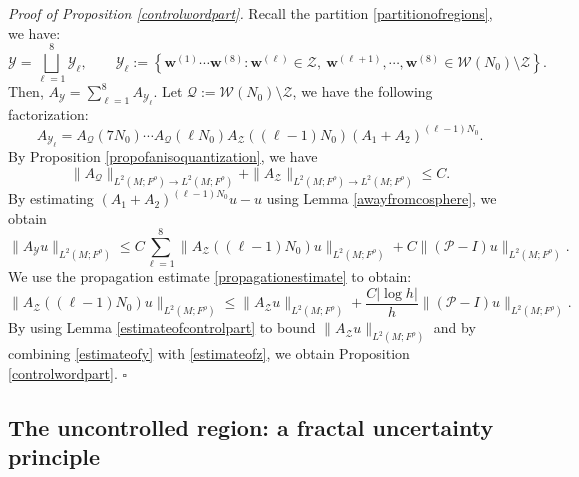 \documentclass[11pt,oneside,reqno]{amsart}
\theoremstyle{definition}
\numberwithin{equation}{section}
\theoremstyle{plain}
\begin{document}
\noindent \textit{Proof of Proposition \ref{controlwordpart}.} Recall the partition \eqref{partitionofregions}, we have:
\begin{equation*}
    \mathcal{Y}=\bigsqcup_{\ell=1}^8 \mathcal{Y}_{\ell}, \qquad \mathcal{Y}_{\ell}:=\left\{\mathbf{w}^{(1)} \cdots \mathbf{w}^{(8)} : \mathbf{w}^{(\ell)} \in \mathcal{Z}, \  \mathbf{w}^{(\ell+1)}, \cdots, \mathbf{w}^{(8)} \in \mathcal{W}(N_0) \setminus \mathcal{Z}\right\}.
\end{equation*}
Then, $A_{\mathcal{Y}}=\sum_{\ell=1}^8 A_{\mathcal{Y}_{\ell}}$. Let $\mathcal{Q}:=\mathcal{W}\left(N_0\right) \setminus \mathcal{Z}$, we have the following factorization:
\begin{equation*}
    A_{\mathcal{Y}_{\ell}}=A_{\mathcal{Q}}(7 N_0) \cdots A_{\mathcal{Q}}(\ell N_0) A_{\mathcal{Z}}((\ell-1) N_0)(A_1+A_2)^{(\ell-1) N_0}.
\end{equation*}
By Proposition \ref{propofanisoquantization}, we have 
\begin{equation*}
    \|A_{\mathcal{Q}}\|_{L^2(M;F^\rho) \rightarrow L^2(M;F^\rho)} + \|A_{\mathcal{Z}}\|_{L^2(M;F^\rho) \rightarrow L^2(M;F^\rho)} \leq C .
\end{equation*}
By estimating $(A_1+A_2)^{(\ell-1) N_0} u-u$ using Lemma \ref{awayfromcosphere}, we obtain
\begin{equation}\label{estimateofy}
\|A_{\mathcal{Y}}u\|_{L^2(M;F^\rho)} \leq C \sum_{\ell=1}^8 \|A_{\mathcal{Z}}((\ell-1) N_0) u\|_{L^2(M;F^\rho)}+C\|(\mathcal{P} -I) u\|_{L^2(M;F^\rho)}.
\end{equation}
We use the propagation estimate \eqref{propagationestimate} to obtain:
\begin{equation}\label{estimateofz}
\|A_{\mathcal{Z}}((\ell-1) N_0) u \|_{L^2(M;F^\rho)} \leq \|A_{\mathcal{Z}} u \|_{L^2(M;F^\rho)}+\frac{C |\log h|}{h}\|(\mathcal{P}-I) u\|_{L^2(M;F^\rho)}.
\end{equation}
By using Lemma \ref{estimateofcontrolpart} to bound $\|A_{\mathcal{Z}} u\|_{L^2(M;F^\rho)}$ and by combining \eqref{estimateofy} with \eqref{estimateofz}, we obtain Proposition \ref{controlwordpart}. \hfill $\square$



\subsection{The uncontrolled region: a fractal uncertainty principle} 
\end{document}
